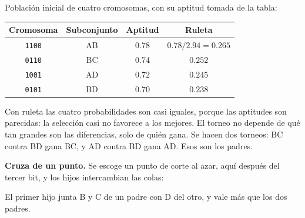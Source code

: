 \documentclass[11pt,letterpaper]{article}
\begin{document}
\begin{ejemplo}
    Población inicial de cuatro cromosomas, con su aptitud tomada de la
    tabla:
    \begin{center}
    \small
    \begin{tabular}{cccc}
        \toprule
        \textbf{Cromosoma} & \textbf{Subconjunto} & \textbf{Aptitud}
            & \textbf{Ruleta} \\
        \midrule
        \texttt{1100} & AB & $0.78$ & $0.78 / 2.94 = 0.265$ \\
        \texttt{0110} & BC & $0.74$ & $0.252$ \\
        \texttt{1001} & AD & $0.72$ & $0.245$ \\
        \texttt{0101} & BD & $0.70$ & $0.238$ \\
        \bottomrule
    \end{tabular}
    \end{center}
    Con ruleta las cuatro probabilidades son casi iguales, porque las
    aptitudes son parecidas: la selección casi no favorece a los
    mejores. El torneo no depende de qué tan grandes son las
    diferencias, solo de quién gana. Se hacen dos torneos: BC contra BD
    gana BC, y AD contra BD gana AD. Esos son los padres.

    \textbf{Cruza de un punto.} Se escoge un punto de corte al azar,
    aquí después del tercer bit, y los hijos intercambian las colas:
    \begin{center}
    \end{center}
    El primer hijo junta B y C de un padre con D del otro, y vale más
    que los dos padres.


\end{ejemplo}
\end{document}
